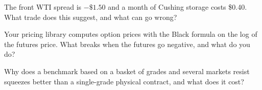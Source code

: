 \begin{interviewq}\label{iq:m3:crude-oil:4}
The front WTI spread is $-\$1.50$ and a month of Cushing storage costs \$0.40. What
trade does this suggest, and what can go wrong?
\end{interviewq}

\begin{interviewq}\label{iq:m3:crude-oil:5}
Your pricing library computes option prices with the Black formula on the log of
the futures price. What breaks when the futures go negative, and what do you do?
\end{interviewq}

\begin{interviewq}\label{iq:m3:crude-oil:6}
Why does a benchmark based on a basket of grades and several markets resist squeezes
better than a single-grade physical contract, and what does it cost?
\end{interviewq}
